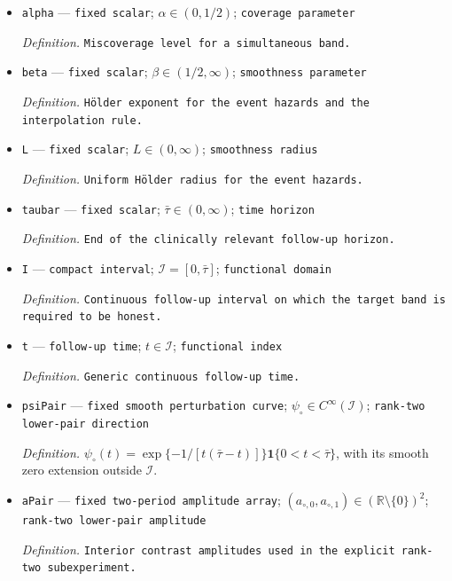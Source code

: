 \documentclass{article}
\begin{document}
\begin{itemize}
  \item \texttt{alpha} --- \texttt{fixed scalar}; \(\alpha\in(0,1/2)\); \texttt{coverage parameter}
  \par\smallskip\noindent\emph{Definition.} \texttt{Miscoverage level for a simultaneous band.}
  \item \texttt{beta} --- \texttt{fixed scalar}; \(\beta\in(1/2,\infty)\); \texttt{smoothness parameter}
  \par\smallskip\noindent\emph{Definition.} \texttt{Hölder exponent for the event hazards and the interpolation rule.}
  \item \texttt{L} --- \texttt{fixed scalar}; \(L\in(0,\infty)\); \texttt{smoothness radius}
  \par\smallskip\noindent\emph{Definition.} \texttt{Uniform Hölder radius for the event hazards.}
  \item \texttt{taubar} --- \texttt{fixed scalar}; \(\bar\tau\in(0,\infty)\); \texttt{time horizon}
  \par\smallskip\noindent\emph{Definition.} \texttt{End of the clinically relevant follow-\allowbreak{}up horizon.}
  \item \texttt{I} --- \texttt{compact interval}; \(\mathcal I=[0,\bar\tau]\); \texttt{functional domain}
  \par\smallskip\noindent\emph{Definition.} \texttt{Continuous follow-\allowbreak{}up interval on which the target band is required to be honest.}
  \item \texttt{t} --- \texttt{follow-\allowbreak{}up time}; \(t\in\mathcal I\); \texttt{functional index}
  \par\smallskip\noindent\emph{Definition.} \texttt{Generic continuous follow-\allowbreak{}up time.}
  \item \texttt{psiPair} --- \texttt{fixed smooth perturbation curve}; \(\psi_\circ\in C^\infty(\mathcal I)\); \texttt{rank-\allowbreak{}two lower-\allowbreak{}pair direction}
  \par\smallskip\noindent\emph{Definition.} \(\psi_\circ(t)=\exp\{-1/[t(\bar\tau-t)]\}\mathbf 1\{0<t<\bar\tau\}\), with its smooth zero extension outside \(\mathcal I\).
  \item \texttt{aPair} --- \texttt{fixed two-\allowbreak{}period amplitude array}; \((a_{\circ,0},a_{\circ,1})\in(\mathbb R\setminus\{0\})^2\); \texttt{rank-\allowbreak{}two lower-\allowbreak{}pair amplitude}
  \par\smallskip\noindent\emph{Definition.} \texttt{Interior contrast amplitudes used in the explicit rank-\allowbreak{}two subexperiment.}

\end{itemize}
\end{document}
